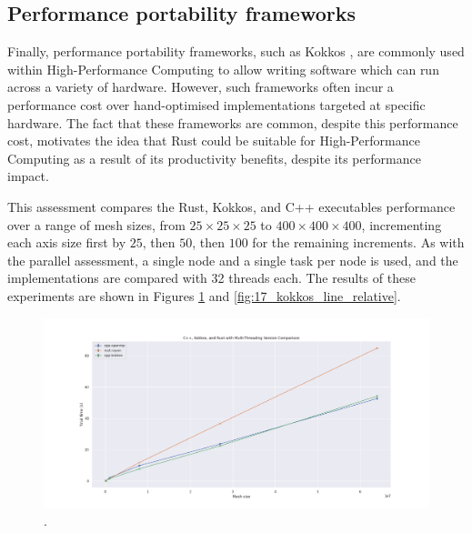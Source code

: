 




\subsection{Performance portability frameworks}
\label{ssec:performance-portability-frameworks}

Finally, performance portability frameworks, such as Kokkos \cite{KokkosEcosystem}, are commonly used within High-Performance Computing to allow writing software which can run across a variety of hardware. However, such frameworks often incur a performance cost over hand-optimised implementations targeted at specific hardware. The fact that these frameworks are common, despite this performance cost, motivates the idea that Rust could be suitable for High-Performance Computing as a result of its productivity benefits, despite its performance impact.

This assessment compares the Rust, Kokkos, and C++ executables performance over a range of mesh sizes, from $25 \times 25 \times 25$ to $400 \times 400 \times 400$, incrementing each axis size first by $25$, then $50$, then $100$ for the remaining increments. As with the parallel assessment, a single node and a single task per node is used, and the implementations are compared with 32 threads each. The results of these experiments are shown in Figures \ref{fig:16_kokkos_line} and \ref{fig:17_kokkos_line_relative}.

\begin{figure}[H]
    \centering
    \includegraphics[width=\textwidth]{images/5_performance/parallelism/16_kokkos_line.png}
    \caption{.}
    \label{fig:16_kokkos_line}
\end{figure}

